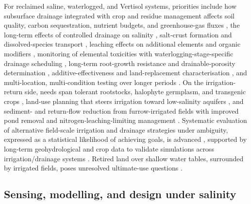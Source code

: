\documentclass[11pt]{article}
\begin{document}
For reclaimed saline, waterlogged, and Vertisol systems, priorities include how
subsurface drainage integrated with crop and residue management affects soil
quality, carbon sequestration, nutrient budgets, and greenhouse-gas fluxes
\parencite{Mukhopadhyay2023,Mukhopadhyay2023b}, the long-term effects of
controlled drainage on salinity \parencite{ElGhannam2023}, salt-crust formation
and dissolved-species transport \parencite{Colombani2016}, leaching effects on
additional elements and organic modifiers \parencite{SoltaniGerdefaramarzi2020},
monitoring of elemental toxicities with waterlogging-stage-specific drainage
scheduling \parencite{Qian2021}, long-term root-growth resistance and
drainable-porosity determination \parencite{Bahçeci2018,Bahceci2008},
additive-effectiveness and land-replacement characterisation \parencite{Isa2023},
and multi-location, multi-condition testing over longer periods
\parencite{Sadhukhan2019}. On the irrigation-return side, needs span tolerant
rootstocks, halophyte germplasm, and transgenic crops \parencite{Cuevas2019},
land-use planning that steers irrigation toward low-salinity aquifers
\parencite{Bethune2008}, and sediment- and return-flow reduction from
furrow-irrigated fields with improved pond removal and nitrogen-leaching-limiting
management \parencite{Bjorneberg2020}. Systematic evaluation of alternative
field-scale irrigation and drainage strategies under ambiguity, expressed as a
statistical likelihood of achieving goals, is advanced \parencite{Alzraiee2013},
supported by long-term geohydrological and crop data to validate simulations
across irrigation/drainage systems \parencite{Yao2017}. Retired land over shallow
water tables, surrounded by irrigated fields, poses unresolved ultimate-use
questions \parencite{Purkey2001}.

\subsection{Sensing, modelling, and design under salinity}
\end{document}
